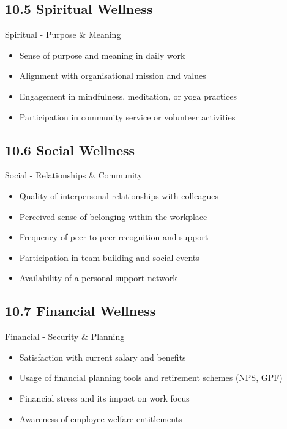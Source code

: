 \documentclass[11pt,a4paper]{article}
\begin{document}
\subsection{10.5 Spiritual Wellness}
\begin{defbox}{Spiritual - Purpose \& Meaning}
\begin{itemize}
  \item Sense of purpose and meaning in daily work
  \item Alignment with organisational mission and values
  \item Engagement in mindfulness, meditation, or yoga practices
  \item Participation in community service or volunteer activities
\end{itemize}
\end{defbox}

\subsection{10.6 Social Wellness}
\begin{defbox}{Social - Relationships \& Community}
\begin{itemize}
  \item Quality of interpersonal relationships with colleagues
  \item Perceived sense of belonging within the workplace
  \item Frequency of peer-to-peer recognition and support
  \item Participation in team-building and social events
  \item Availability of a personal support network
\end{itemize}
\end{defbox}

\subsection{10.7 Financial Wellness}
\begin{defbox}{Financial - Security \& Planning}
\begin{itemize}
  \item Satisfaction with current salary and benefits
  \item Usage of financial planning tools and retirement schemes (NPS, GPF)
  \item Financial stress and its impact on work focus
  \item Awareness of employee welfare entitlements
\end{itemize}
\end{defbox}
\end{document}
